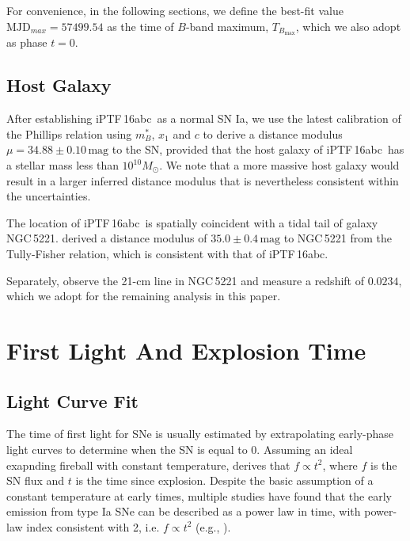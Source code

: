 \documentclass[twocolumn]{aastex61}
\newcommand{\sm}{M_\odot}
\newcommand{\abc}{iPTF\,16abc}
\begin{document}
For convenience, in the following sections, we define the best-fit
value $\textrm{MJD}_{max}=57499.54$ as the time of $B$-band maximum, $T_{B_\mathrm{max}}$, which we also adopt as phase $t=0$.

\subsection{Host Galaxy}
\label{sec:host}

After establishing \abc\ as a normal SN Ia, we use the latest
calibration \citep{2014A&A...568A..22B} of the Phillips relation
\citep{1993ApJ...413L.105P} using $m^*_{B}$, $x_1$ and $c$ to derive 
a distance modulus $\mu = 34.88 \pm 0.10 \,\textrm{mag}$ to the SN, 
provided that the host galaxy of \abc\ has a stellar mass less than
$10^{10}\sm$. We note that a more massive host galaxy would result 
in a larger inferred distance modulus that is nevertheless 
consistent within the uncertainties.

The location of \abc\ is spatially coincident with a tidal tail of
galaxy NGC\,5221. \citet{2007A&A...465...71T} derived a distance
modulus of $35.0\pm0.4\,\textrm{mag}$ to NGC\,5221 from the 
Tully-Fisher relation, which is consistent with that of \abc.

Separately, \citet{2015MNRAS.447.1531C} observe the 21-cm line in
NGC\,5221 and measure a redshift of $0.0234$, which we adopt for the remaining analysis in this paper.

\section{First Light And Explosion Time}
\label{sec:first_light}

\subsection{Light Curve Fit}
\label{sec:lc_fit}

The time of first light for SNe is usually estimated by 
extrapolating early-phase light curves to determine when the 
SN is equal to 0. Assuming an ideal exapnding fireball with 
constant temperature, \citet{1982ApJ...253..785A} derives that $f 
\propto t^2$, where $f$ is the SN flux and $t$ is the time since 
explosion. Despite the basic assumption of a constant temperature at 
early times, multiple studies have found that the early emission 
from type Ia SNe can be described as a power law in time, with 
power-law index consistent with 2, i.e. $f \propto t^2$ (e.g., \citep{2006AJ....132.1707C, 2010ApJ...712..350H, 2011MNRAS.416.2607G}).
\end{document}
